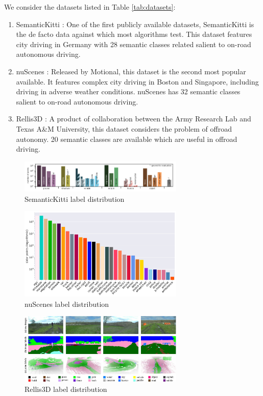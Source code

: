 We consider the datasets listed in Table \ref{tab:datasets}:
\begin{enumerate}
  \item SemanticKitti \cite{semantickitti}: One of the first publicly available datasets, SemanticKitti is the de facto data against which most algorithms test. This dataset features city driving in Germany with 28 semantic classes related salient to on-road autonomous driving.
  \item nuScenes \cite{nuscenes}: Released by Motional, this dataset is the second most popular available. It features complex city driving in Boston and Singapore, including driving in adverse weather conditions. nuScenes has 32 semantic classes salient to on-road autonomous driving.
  \item Rellis3D \cite{rellis3d}: A product of collaboration between the Army Research Lab and Texas A\&M University, this dataset considers the problem of offroad autonomy. 20 semantic classes are available which are useful in offroad driving.
\end{enumerate}

\begin{figure}[htp]
  \centering
  \includegraphics[width=0.7\textwidth]{images/semantic_kitti_label_distribution.png}
  \caption{SemanticKitti label distribution}
  \label{fig:semantickitti-label-distribution}
\end{figure}

\begin{figure}[htp]
  \centering
  \includegraphics[width=0.7\textwidth]{images/nuscenes_label_set.png}
  \caption{nuScenes label distribution}
  \label{fig:nuscenes-label-set}
\end{figure}

\begin{figure}[htp]
  \centering
  \includegraphics[width=0.7\textwidth]{images/rellis_label_suite.png}
  \caption{Rellis3D label distribution}
  \label{fig:rellis-labe-suite}
\end{figure}

